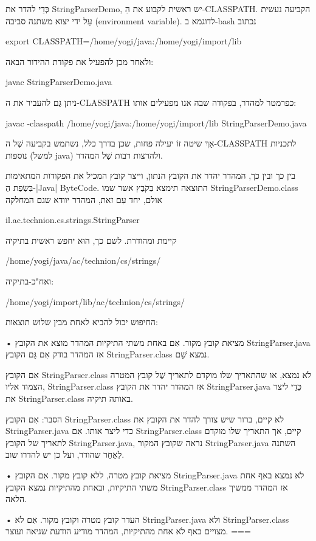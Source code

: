 כְּדֵי להדר את StringParserDemo, יש ראשית לקבוע את הַ-CLASSPATH. הקביעה
נעשית עַל ידי יצוא משתנה סביבה (environment variable). לדוגמא ב-bash נכתוב

export CLASSPATH=/home/yogi/java:/home/yogi/import/lib

ולאחר מכן להפעיל את פקודת ההידור הבאה:

javac StringParserDemo.java

ניתן גַּם להעביר את ה-CLASSPATH כפרמטר למהדר, בפקודה שבה אנו מפעילים אותו:

javac -classpath /home/yogi/java:/home/yogi/import/lib StringParserDemo.java

אַךְ שיטה זוֹ יעילה פחות, שכן בדרך כלל, נשתמש בקביעה שֶׁל ה-CLASSPATH לתכניות
נוספות (למשל java) ולהרצות רבות שֶׁל המהדר.

בין כך ובין כך, המהדר יהדר את הקובץ הנתון, וייצר קובץ המכיל את
הפקודות המתאימות בִּשְׂפַת הַ-|Java| ByteCode. התוצאה תימצא בְּקֹבֶץ אשר שמו
StringParserDemo.class אולם, יחד עִם זאת, המהדר יוודא שגם המחלקה

 il.ac.technion.cs.strings.StringParser

קיימת ומהודרת. לשם כך, הוּא יחפש ראשית בתיקיה

/home/yogi/java/ac/technion/cs/strings/

ואח"כ-בתיקיה:

/home/yogi/import/lib/ac/technion/cs/strings/

החיפוש יכול להביא לאחת מבין שלוש תוצאות:


• מציאת קובץ מקור. אִם באחת משתי התיקיות המהדר מוצא את הקובץ
StringParser.java אז המהדר בודק אִם גַּם הקובץ StringParser.class נמצא
שֵׁם.

אִם הקובץ StringParser.class לֹא נמצא, או שהתאריך שלו מוקדם לתאריך שֶׁל קובץ
המטרה הצמוד אליו, StringParser.class אז המהדר יהדר את הקובץ
StringParser.java כְּדֵי ליצר את StringParser.class באותה תיקיה.

הסבר: אִם הקובץ StringParser.class לא קיים, ברור שיש צורך להדר את הקובץ את
StringParser.java כדי ליצר אותו. אִם StringParser.class קיים, אך התאריך שלו
מוקדם לתאריך של הקובץ StringParser.java, נראה שקובץ המקור StringParser.java
השתנה לְאַחַר שהודר, ועל כן יש להדרו שוב.

• מציאת קובץ מטרה, ללא קובץ מקור. אִם הקובץ StringParser.java לֹא נמצא באף
אחת משתי התיקיות, ובאחת מהתיקיות נמצא הקובץ StringParser.class אז המהדר
ממשיך הלאה.

• העדר קובץ מטרה וקובץ מקור. אִם לֹא StringParser.java ולא StringParser.class
מצויים באף לֹא אחת מהתיקיות, המהדר מודיע הודעת שגיאה ועוצר.
===

